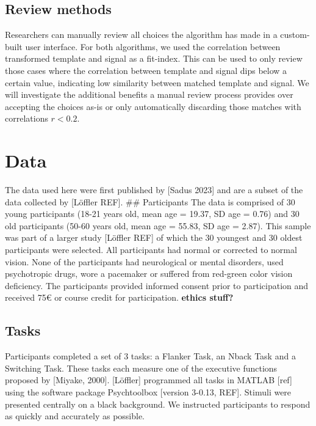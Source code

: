 \documentclass[
  man,floatsintext]{apa7}
\begin{document}
\hypertarget{review-methods}{%
\subsection{Review methods}\label{review-methods}}

Researchers can manually review all choices the algorithm has made in a custom-built user interface. For both algorithms, we used the correlation between transformed template and signal as a fit-index. This can be used to only review those cases where the correlation between template and signal dips below a certain value, indicating low similarity between matched template and signal. We will investigate the additional benefits a manual review process provides over accepting the choices as-is or only automatically discarding those matches with correlations \(r < 0.2\).

\hypertarget{data}{%
\section{Data}\label{data}}

The data used here were first published by {[}Sadus 2023{]} and are a subset of the data collected by {[}Löffler REF{]}.
\#\# Participants
The data is comprised of 30 young participants (18-21 years old, mean age = 19.37, SD age = 0.76) and 30 old participants (50-60 years old, mean age = 55.83, SD age = 2.87). This sample was part of a larger study {[}Löffler REF{]} of which the 30 youngest and 30 oldest participants were selected. All participants had normal or corrected to normal vision. None of the participants had neurological or mental disorders, used psychotropic drugs, wore a pacemaker or suffered from red-green color vision deficiency. The participants provided informed consent prior to participation and received 75€ or course credit for participation. \textbf{ethics stuff?}

\hypertarget{tasks}{%
\subsection{Tasks}\label{tasks}}

Participants completed a set of 3 tasks: a Flanker Task, an Nback Task and a Switching Task. These tasks each measure one of the executive functions proposed by {[}Miyake, 2000{]}. {[}Löffler{]} programmed all tasks in MATLAB {[}ref{]} using the software package Psychtoolbox {[}version 3-0.13, REF{]}. Stimuli were presented centrally on a black background. We instructed participants to respond as quickly and accurately as possible.
\end{document}
